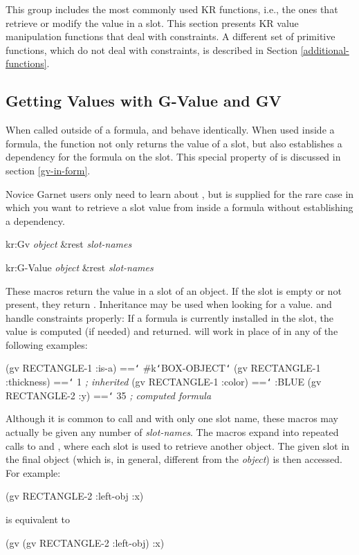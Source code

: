 This group includes the most commonly used KR functions, i.e., the ones
that retrieve or modify the value in a slot.  This section presents KR value
manipulation functions that deal with constraints.  A different
set of primitive functions, which do not deal with constraints, is
described in Section \ref{additional-functions}.


\subsection{Getting Values with G-Value and GV}
\label{g-value-and-gv}

When called outside of a formula,  and  behave identically.
When used inside a formula, the function  not only returns the value
of a slot, but also establishes a dependency for the formula on the slot.
This special property of  is discussed in section \ref{gv-in-form}.

Novice Garnet users only need to learn about , but  is
supplied for the rare case in which you want to retrieve a slot value from
inside a formula without establishing a dependency.

\begin{example}
kr:Gv {\it object} \&rest {\it slot-names}\value{macro}

kr:G-Value {\it object} \&rest {\it slot-names}\value{macro}
\end{example}

These macros return the value in a slot of an object.  If the slot is
empty or not present, they return \value{nil}.  Inheritance may be used
when looking for a value.   and  handle constraints
properly:  If a formula is currently installed in the slot, the value is
computed (if needed) and returned.   will work in place of 
in any of the following examples:

\begin{programexample}
(gv RECTANGLE-1 :is-a) =={\tt\char`\>} \#k{\tt\char`\<}BOX-OBJECT{\tt\char`\>}
(gv RECTANGLE-1 :thickness) =={\tt\char`\>} 1   {\it ; inherited}
(gv RECTANGLE-1 :color) =={\tt\char`\>} :BLUE
(gv RECTANGLE-2 :y) =={\tt\char`\>} 35          {\it ; computed formula}
\end{programexample}

Although it is common to call  and  with only one slot name,
these macros may actually be given any number of {\it slot-names}.  The macros
expand into repeated calls to  and , where each slot is
used to retrieve another object.  The given slot in the final object (which
is, in general, different from the {\it object}) is then
accessed.  For example:
\begin{programexample}
(gv RECTANGLE-2 :left-obj :x)
\end{programexample}
is equivalent to
\begin{programexample}
(gv (gv RECTANGLE-2 :left-obj) :x)
\end{programexample}

